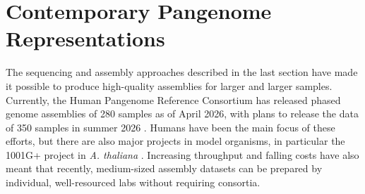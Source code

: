 \newpage
\section*{Contemporary Pangenome Representations}


The sequencing and assembly approaches described in the last section have made it possible to produce high-quality assemblies for larger and larger samples.
Currently, the Human Pangenome Reference Consortium has released phased genome assemblies of 280 samples as of April 2026, with plans to release the data of 350 samples in summer 2026 \cite{hprc2, hprc-timeline}.
Humans have been the main focus of these efforts, but there are also major projects in model organisms, in particular the 1001G+ project in \textit{A. thaliana} \cite{1001g+, nassir25, wang26, hprc2}. %
Increasing throughput and falling costs have also meant that recently, medium-sized assembly datasets can be prepared by individual, well-resourced labs without requiring consortia\cite{lian24, sun25, igolkina25, gross26}.



